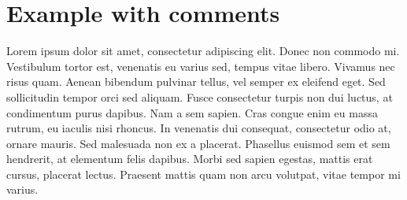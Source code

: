 \documentclass[11pt, a4paper, draft]{article} %
\begin{document}
\section{Example with comments}
Lorem ipsum dolor sit amet, consectetur adipiscing elit.
Donec non commodo mi.
Vestibulum tortor est, venenatis eu varius sed, tempus vitae libero.
Vivamus nec risus quam. %
Aenean bibendum pulvinar tellus, vel semper ex eleifend eget.
Sed sollicitudin tempor orci sed aliquam.
Fusce consectetur turpis non dui luctus, at condimentum purus dapibus.
Nam a sem sapien.
Cras congue enim eu massa rutrum, eu iaculis nisi rhoncus.
In venenatis dui consequat, consectetur odio at, ornare mauris.
Sed malesuada non ex a placerat.
Phasellus euismod sem et sem hendrerit, at elementum felis dapibus.
Morbi sed sapien egestas, mattis erat cursus, placerat lectus.
Praesent mattis quam non arcu volutpat, vitae tempor mi varius.
\end{document}

